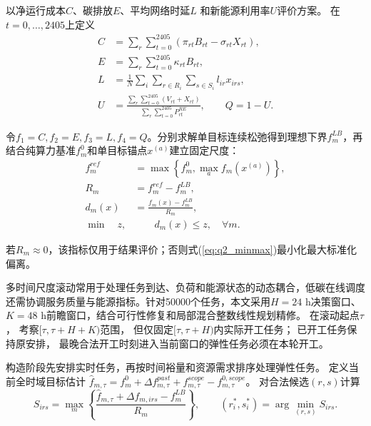 以净运行成本$C$、碳排放$E$、平均网络时延$L$
和新能源利用率$U$评价方案。
在$t=0,\ldots,2405$上定义
\begin{equation}
	\begin{aligned}
		C
		&=
		\sum_r\sum_{t=0}^{2405}
		\left(\pi_{rt}B_{rt}-\sigma_{rt}X_{rt}\right),\\
		E
		&=
		\sum_r\sum_{t=0}^{2405}\kappa_{rt}B_{rt},\\
		L
		&=
		\frac{1}{N}
		\sum_i\sum_{r\in R_i}\sum_{s\in S_i}
		l_{ir}x_{irs},\\
		U
		&=
		\frac{\displaystyle
			\sum_r\sum_{t=0}^{2405}(V_{rt}+X_{rt})}
		{\displaystyle
			\sum_r\sum_{t=0}^{2405}P^{RE}_{rt}},
		\qquad Q=1-U.
	\end{aligned}
	\label{eq:q2_objectives}
\end{equation}

令$f_1=C,f_2=E,f_3=L,f_4=Q$。分别求解单目标连续松弛得到理想下界$f_m^{LB}$，再结合纯算力基准$f_m^0$和单目标锚点$x^{(a)}$建立固定尺度：
\begin{equation}
	\begin{aligned}
		f_m^{ref}
		&=
		\max\left\{
		f_m^0,\max_a f_m(x^{(a)})
		\right\},\\
		R_m
		&=
		f_m^{ref}-f_m^{LB},\\
		d_m(x)
		&=
		\frac{f_m(x)-f_m^{LB}}{R_m},\\
		\min\quad z,
		&\qquad d_m(x)\leq z,\quad \forall m .
	\end{aligned}
	\label{eq:q2_minmax}
\end{equation}

若$R_m\approx0$，该指标仅用于结果评价；否则式(\ref{eq:q2_minmax})最小化最大标准化偏离。

多时间尺度滚动常用于处理任务到达、负荷和能源状态的动态耦合\cite{ref7}，低碳在线调度还需协调服务质量与能源指标\cite{ref8}。针对50000个任务，本文采用$H=24$ h决策窗口、$K=48$ h前瞻窗口，结合可行性修复和局部混合整数线性规划精修。
在滚动起点$\tau$，
考察$[\tau,\tau+H+K)$范围，
但仅固定$[\tau,\tau+H)$内实际开工任务；
已开工任务保持原安排，
最晚合法开工时刻进入当前窗口的弹性任务必须在本轮开工。

构造阶段先安排实时任务，再按时间裕量和资源需求排序处理弹性任务。
定义当前全时域目标估计
$\hat f_{m,\tau}
=f_m^0+\Delta f_{m,\tau}^{past}
+f_{m,\tau}^{scope}-f_{m,\tau}^{0,scope}$。
对合法候选$(r,s)$计算
\begin{equation}
	S_{irs}
	=
	\max_m
	\left\{
	\frac{
		\hat f_{m,\tau}
		+\Delta f_{m,irs}
		-f_m^{LB}}
	{R_m}
	\right\},
	\qquad
	(r_i^*,s_i^*)
	=
	\arg\min_{(r,s)}S_{irs}.
	\label{eq:q2_marginal}
\end{equation}

